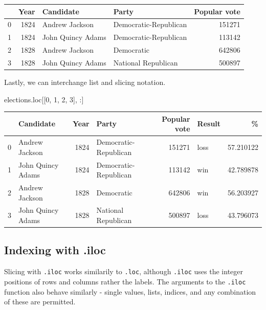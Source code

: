 \documentclass[
  letterpaper,
  DIV=11,
  numbers=noendperiod]{scrreprt}
\newenvironment{Shaded}{\begin{snugshade}}{\end{snugshade}}
\newcommand{\DecValTok}[1]{\textcolor[rgb]{0.68,0.00,0.00}{#1}}
\newcommand{\NormalTok}[1]{\textcolor[rgb]{0.00,0.23,0.31}{#1}}
\begin{document}
\begin{tabular}{lrllr}
\toprule
{} &  Year &          Candidate &                  Party &  Popular vote \\
\midrule
0 &  1824 &     Andrew Jackson &  Democratic-Republican &        151271 \\
1 &  1824 &  John Quincy Adams &  Democratic-Republican &        113142 \\
2 &  1828 &     Andrew Jackson &             Democratic &        642806 \\
3 &  1828 &  John Quincy Adams &    National Republican &        500897 \\
\bottomrule
\end{tabular}

Lastly, we can interchange list and slicing notation.

\begin{Shaded}
\begin{Highlighting}[]
\NormalTok{elections.loc[[}\DecValTok{0}\NormalTok{, }\DecValTok{1}\NormalTok{, }\DecValTok{2}\NormalTok{, }\DecValTok{3}\NormalTok{], :]}
\end{Highlighting}
\end{Shaded}

\begin{tabular}{llrlrlr}
\toprule
{} &          Candidate &  Year &                  Party &  Popular vote & Result &          \% \\
\midrule
0 &     Andrew Jackson &  1824 &  Democratic-Republican &        151271 &   loss &  57.210122 \\
1 &  John Quincy Adams &  1824 &  Democratic-Republican &        113142 &    win &  42.789878 \\
2 &     Andrew Jackson &  1828 &             Democratic &        642806 &    win &  56.203927 \\
3 &  John Quincy Adams &  1828 &    National Republican &        500897 &   loss &  43.796073 \\
\bottomrule
\end{tabular}

\hypertarget{indexing-with-.iloc}{%
\subsection{Indexing with .iloc}\label{indexing-with-.iloc}}

Slicing with \texttt{.iloc} works similarily to \texttt{.loc}, although
\texttt{.iloc} uses the integer positions of rows and columns rather the
labels. The arguments to the \texttt{.iloc} function also behave
similarly - single values, lists, indices, and any combination of these
are permitted.
\end{document}
